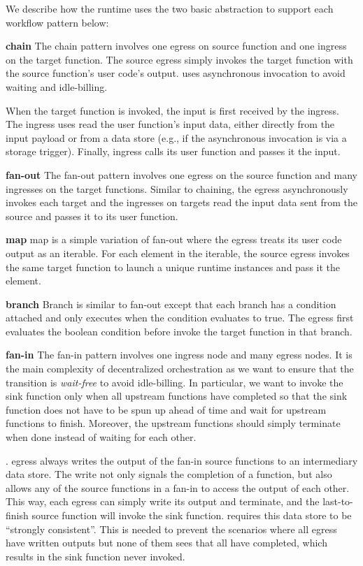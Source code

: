 We describe how the \name{} runtime uses the two basic abstraction to support
each workflow pattern below:

\noindent\textbf{chain} 
The chain pattern involves one egress on source function and one ingress on
the target function. The source egress simply invokes the target function with
the source function's user code's output. \name{} uses asynchronous invocation
to avoid waiting and idle-billing.

When the target function is invoked, the input is first received by the
\name{} ingress. The ingress uses read the user function's input data, either
directly from the input payload or from a data store (e.g., if the
asynchronous invocation is via a storage trigger). Finally, ingress calls its
user function and passes it the input.

\noindent\textbf{fan-out}
The fan-out pattern involves one egress on the source function and many
ingresses on the target functions.
Similar to chaining, the egress asynchronously invokes each target and the
ingresses on targets read the input data sent from the source and passes it to
its user function.

\noindent\textbf{map}
map is a simple variation of fan-out where the egress treats its user code
output as an iterable. For each element in the iterable, the source egress
invokes the same target function to launch a unique runtime instances and pass
it the element.

\noindent\textbf{branch}
Branch is similar to fan-out except that each branch has a condition attached
and only executes when the condition evaluates to true. The egress first
evaluates the boolean condition before invoke the target function in that
branch. 

\textbf{fan-in}
The fan-in pattern involves one ingress node and many egress nodes.
It is the main complexity of decentralized orchestration as we want to ensure
that the transition is \emph{wait-free} to avoid idle-billing. In particular,
we want to invoke the sink function only when all upstream functions have
completed so that the sink function does not have to be spun up ahead of time and
wait for upstream functions to finish. Moreover, the upstream functions should
simply terminate when done instead of waiting for each other.

. \name{} egress always writes the output of the fan-in source
functions to an intermediary data store. The write not only signals the
completion of a function, but also allows any of the source functions in a fan-in to
access the output of each other. This way, each egress can simply write its
output and terminate, and the last-to-finish source function will invoke the
sink function.
\name{} requires this data store to be ``strongly consistent''. This is needed to prevent the
scenarios where all egress have written outputs but none of them sees that all
have completed, which results in the sink function never invoked.

